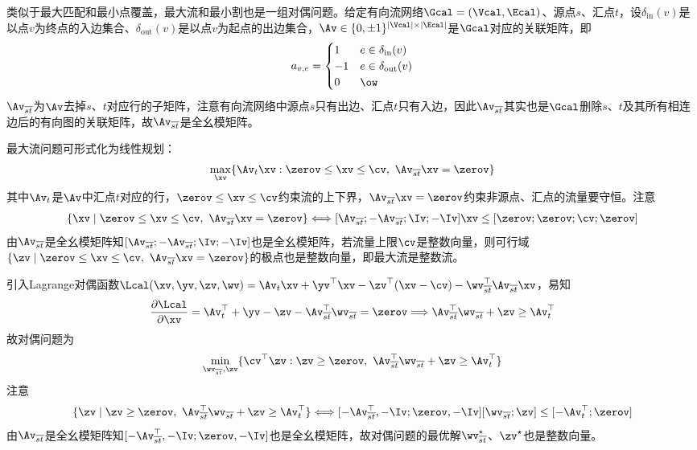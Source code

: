 \documentclass{ctexart}
\begin{document}
类似于最大匹配和最小点覆盖，最大流和最小割也是一组对偶问题。给定有向流网络$\Gcal = (\Vcal, \Ecal)$、源点$s$、汇点$t$，设$\delta_{\text{in}}(v)$是以点$v$为终点的入边集合、$\delta_{\text{out}}(v)$是以点$v$为起点的出边集合，$\Av \in \{ 0, \pm 1 \}^{|\Vcal| \times |\Ecal|}$是$\Gcal$对应的关联矩阵，即
\begin{align*}
    a_{v,e} = \begin{cases}
        1  & e \in \delta_{\text{in}} (v)  \\
        -1 & e \in \delta_{\text{out}} (v) \\
        0  & \ow
    \end{cases}
\end{align*}
$\Av_{\overline{st}}$为$\Av$去掉$s$、$t$对应行的子矩阵，注意有向流网络中源点$s$只有出边、汇点$t$只有入边，因此$\Av_{\overline{st}}$其实也是$\Gcal$删除$s$、$t$及其所有相连边后的有向图的关联矩阵，故$\Av_{\overline{st}}$是全幺模矩阵。

最大流问题可形式化为线性规划：
\begin{align*}
    \max_{\xv} \{ \Av_t \xv : \zerov \le \xv \le \cv, ~ \Av_{\overline{st}} \xv = \zerov \}
\end{align*}
其中$\Av_t$是$\Av$中汇点$t$对应的行，$\zerov \le \xv \le \cv$约束流的上下界，$\Av_{\overline{st}} \xv = \zerov$约束非源点、汇点的流量要守恒。注意
\begin{align*}
    \{ \xv \mid \zerov \le \xv \le \cv, ~ \Av_{\overline{st}} \xv = \zerov \} \Longleftrightarrow [\Av_{\overline{st}}; -\Av_{\overline{st}}; \Iv; -\Iv] \xv \leq [\zerov; \zerov; \cv; \zerov]
\end{align*}
由$\Av_{\overline{st}}$是全幺模矩阵知$[\Av_{\overline{st}}; -\Av_{\overline{st}}; \Iv; -\Iv]$也是全幺模矩阵，若流量上限$\cv$是整数向量，则可行域$\{ \zv \mid \zerov \le \xv \le \cv, ~ \Av_{\overline{st}} \xv = \zerov \}$的极点也是整数向量，即最大流是整数流。

引入Lagrange对偶函数$\Lcal(\xv, \yv, \zv, \wv) = \Av_t \xv + \yv^\top \xv - \zv^\top (\xv - \cv) - \wv_{\overline{st}}^\top \Av_{\overline{st}} \xv$，易知
\begin{align*}
    \frac{\partial \Lcal}{\partial \xv} = \Av_t^\top + \yv - \zv - \Av_{\overline{st}}^\top \wv_{\overline{st}} = \zerov \Longrightarrow \Av_{\overline{st}}^\top \wv_{\overline{st}} + \zv \ge \Av_t^\top
\end{align*}
故对偶问题为
\begin{align*}
    \min_{\wv_{\overline{st}}, \zv} \{ \cv^\top \zv : \zv \ge \zerov, ~ \Av_{\overline{st}}^\top \wv_{\overline{st}} + \zv \ge \Av_t^\top \}
\end{align*}
注意
\begin{align*}
    \{ \zv \mid \zv \ge \zerov, ~ \Av_{\overline{st}}^\top \wv_{\overline{st}} + \zv \ge \Av_t^\top \} \Longleftrightarrow [-\Av_{\overline{st}}^\top, -\Iv; \zerov, -\Iv] [\wv_{\overline{st}}; \zv] \leq [-\Av_t^\top; \zerov]
\end{align*}
由$\Av_{\overline{st}}$是全幺模矩阵知$[-\Av_{\overline{st}}^\top, -\Iv; \zerov, -\Iv]$也是全幺模矩阵，故对偶问题的最优解$\wv_{\overline{st}}^\star$、$\zv^\star$也是整数向量。
\end{document}
